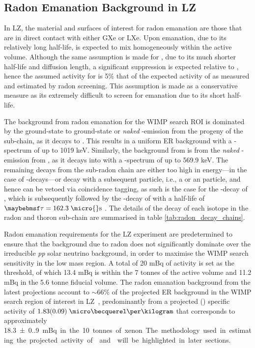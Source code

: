 \subsection{Radon Emanation Background in LZ}
\label{secsec:radon_in_lz}

In LZ, the material and surfaces of interest for radon emanation are those that are in direct contact with either GXe or LXe. Upon emanation, due to its relatively long half-life, \RnTTT{} is expected to mix homogeneously within the active volume. Although the same assumption is made for \RnTTZ{}, due to its much shorter half-life and diffusion length, a significant suppression is expected relative to \RnTTT{}, hence the assumed activity for \RnTTZ{} is 5\% that of the expected activity of \RnTTT{} as measured and estimated by radon screening. This assumption is made as a conservative measure as its extremely difficult to screen for \RnTTZ{} emanation due to its short half-life.

The background from radon emanation for the WIMP search ROI is dominated by the ground-state to ground-state or \textit{naked} \beta-emission from the \PbTOF{} progeny of the \RnTTT{} sub-chain, as it decays to \BiTOF. This results in a uniform ER background with a \beta-spectrum of up to 1019 keV. Similarly, the background from \RnTTZ{} is from the \textit{naked} \beta-emission from \PbTOT{}, as it decays into \BiTOT{} with a \beta-spectrum of up to 569.9 keV. The remaining decays from the sub-radon chain are either too high in energy---in the case of \alpha-decays---or decay with a subsequent particle, i.e., a \gray{} or an \alpha particle, and hence can be vetoed via coincidence tagging, as such is the case for the \beta-decay of \BiTOF{}, which is subsequently followed by the \alpha-decay of \PbTOF{} with a half-life of $\tau{} = 162.3 \; \MathText{\micro{}s}$ \cite{radiogenic_muon_lux,Araujo:2011as}. The details of the decay of each isotope in the radon and thoron sub-chain are summarised in table \ref{tab:radon_decay_chains}.

Radon emanation requirements for the LZ experiment are predetermined to ensure that the background due to radon does not significantly dominate over the irreducible \textit{pp} solar neutrino background, in order to maximise the WIMP search sensitivity in the low mass region. A total of 20 mBq of \RnTTT{} activity is set as the threshold, of which 13.4 mBq is within the 7 tonnes of the active volume and 11.2 mBq in the 5.6 tonne fiducial volume. The radon emanation background from the latest projections account to $\sim66\%$ of the projected ER background in the WIMP search region of interest in LZ~\cite{akerib2018projected}, predominantly from a projected \RnTTT{}(\RnTTZ{}) specific activity of $1.83(0.09) \; {\micro\becquerel\per\kilogram}$ that corresponds to approximately \SI{18.3(0.9)} mBq in the 10 tonnes of xenon. The methodology used in estimating the projected activity of \RnTTT{} and \RnTTZ{} will be highlighted in later sections. 

